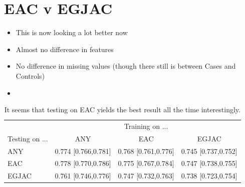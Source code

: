 \documentclass[12pt]{article}
\begin{document}
\clearpage
\section*{EAC v EGJAC}

\begin{itemize}
	\item This is now looking a lot better now
	\item Almost no difference in features
	\item No difference in missing values (though there still is between Cases and Controls)
	\item 
\end{itemize}

\begin{table}[ht]
\centering
\begin{tabular}{lccc}
  \toprule
  & \multicolumn{3}{c}{Training on ...} \\ \cmidrule(l){2-4}
Testing on ... & ANY & EAC & EGJAC \\ 
  \midrule
ANY & 0.774 [0.766,0.781] & 0.768 [0.761,0.776] & 0.745 [0.737,0.752] \\ 
  EAC & 0.778 [0.770,0.786] & 0.775 [0.767,0.784] & 0.747 [0.738,0.755] \\ 
  EGJAC & 0.761 [0.746,0.776] & 0.747 [0.732,0.763] & 0.738 [0.723,0.754] \\ 
   \bottomrule
\end{tabular}
\caption{It seems that testing on EAC yields the best result all the time interestingly.}
\end{table}
\end{document}
